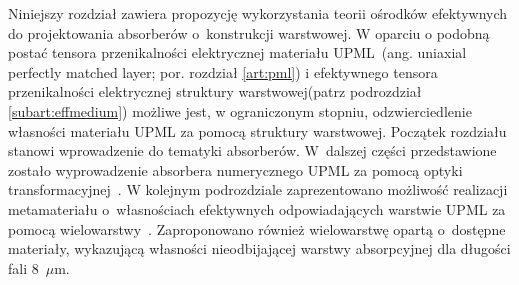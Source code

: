 Niniejszy rozdział zawiera propozycję wykorzystania teorii ośrodków efektywnych do projektowania absorberów o~konstrukcji warstwowej. W oparciu o podobną postać tensora przenikalności elektrycznej materiału UPML~(ang. uniaxial perfectly matched layer; por. rozdział \ref{art:pml}) i efektywnego tensora przenikalności elektrycznej struktury warstwowej(patrz podrozdział \ref{subart:effmedium}) możliwe jest, w ograniczonym stopniu, odzwierciedlenie własności materiału UPML za pomocą struktury warstwowej. Początek rozdziału stanowi wprowadzenie do tematyki absorberów. W~dalszej części przedstawione zostało wyprowadzenie absorbera numerycznego UPML za pomocą optyki transformacyjnej~\cite{pendry2012transformation}. W kolejnym podrozdziale zaprezentowano możliwość realizacji metamateriału o~własnościach efektywnych odpowiadających warstwie UPML za pomocą wielowarstwy~\cite{ania2015}. Zaproponowano również wielowarstwę opartą o~dostępne materiały, wykazującą własności nieodbijającej warstwy absorpcyjnej dla długości fali $8$~$\mu$m.


